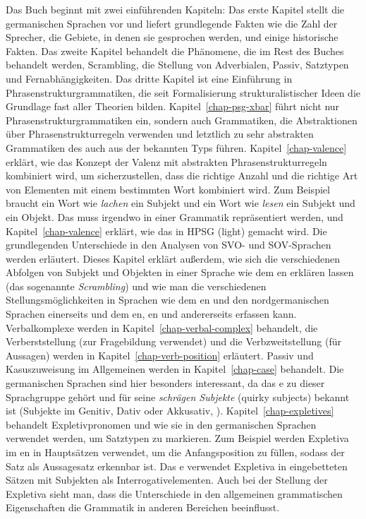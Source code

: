 Das Buch beginnt mit zwei einführenden Kapiteln: Das erste Kapitel stellt die germanischen Sprachen vor
und liefert grundlegende Fakten wie die Zahl der Sprecher, die Gebiete, in denen sie gesprochen werden, und einige historische
Fakten. Das zweite Kapitel behandelt die Phänomene, die im Rest des Buches behandelt werden, \zb Scrambling,
die Stellung von Adverbialen, Passiv, Satztypen und Fernabhängigkeiten. Das dritte Kapitel ist eine
Einführung in Phrasenstrukturgrammatiken, die seit  Formalisierung strukturalistischer Ideen
\citep{Bloomfield33a-u} die Grundlage fast aller Theorien bilden. Kapitel~\ref{chap-psg-xbar} führt nicht nur Phrasenstrukturgrammatiken ein,
sondern auch Grammatiken, die Abstraktionen über Phrasenstrukturregeln verwenden und letztlich zu sehr
abstrakten Grammatiken des auch aus der \xbart
\citep{Jackendoff77a} bekannten Typs führen. Kapitel~\ref{chap-valence} erklärt, wie das Konzept der Valenz
mit abstrakten Phrasenstrukturregeln kombiniert wird, um sicherzustellen, dass die richtige Anzahl und die richtige Art von
Elementen mit einem bestimmten Wort kombiniert wird. Zum Beispiel braucht ein Wort wie \emph{lachen} ein Subjekt und
ein Wort wie \emph{lesen} ein Subjekt und ein Objekt. Das muss irgendwo in einer
Grammatik repräsentiert werden, und Kapitel~\ref{chap-valence} erklärt, wie das in HPSG (light) gemacht wird. Die grundlegenden Unterschiede
in den Analysen von SVO- und SOV-Sprachen werden erläutert. Dieses Kapitel
erklärt außerdem, wie sich die verschiedenen Abfolgen von Subjekt und Objekten in einer Sprache wie dem en erklären lassen
(das sogenannte \emph{Scrambling}) und wie man die verschiedenen Stellungsmöglichkeiten in Sprachen wie dem en
und den nordgermanischen Sprachen einerseits und dem en, en und  andererseits erfassen kann. Verbalkomplexe werden in Kapitel~\ref{chap-verbal-complex} behandelt, die Verberststellung (zur Fragebildung verwendet) und die Verbzweitstellung (für Aussagen) werden
in Kapitel~\ref{chap-verb-position} erläutert. Passiv und Kasuszuweisung im Allgemeinen werden in
Kapitel~\ref{chap-case} behandelt. Die germanischen Sprachen sind hier besonders interessant, da das e
zu dieser Sprachgruppe gehört und für seine \emph{schrägen Subjekte} (quirky subjects) bekannt ist (Subjekte im Genitiv, Dativ oder
Akkusativ, \citealp{ZMT85a}). Kapitel~\ref{chap-expletives} behandelt Expletivpronomen und wie sie
in den germanischen Sprachen verwendet werden, um Satztypen zu markieren. Zum Beispiel werden Expletiva im
en in Hauptsätzen verwendet, um die Anfangsposition zu füllen, sodass der Satz als
Aussagesatz erkennbar ist. Das e verwendet
Expletiva in eingebetteten Sätzen mit Subjekten als Interrogativelementen. Auch bei der Stellung der
Expletiva sieht man, dass die Unterschiede in den allgemeinen grammatischen Eigenschaften die
Grammatik in anderen Bereichen beeinflusst.

